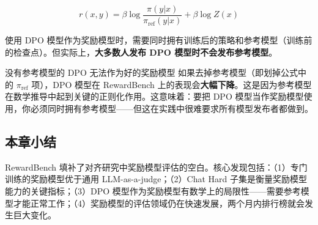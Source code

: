 $$r(x, y) = \beta \log \frac{\pi(y|x)}{\pi_{\mathrm{ref}}(y|x)} + \beta \log Z(x)$$

使用 DPO 模型作为奖励模型时，需要同时拥有训练后的策略和参考模型（训练前的检查点）。但实际上，\textbf{大多数人发布 DPO 模型时不会发布参考模型}。

\begin{warningbox}{没有参考模型的 DPO 无法作为好的奖励模型}
如果去掉参考模型（即划掉公式中的 $\pi_{\mathrm{ref}}$ 项），DPO 模型在 RewardBench 上的表现会\textbf{大幅下降}。这是因为参考模型在数学推导中起到关键的正则化作用。这意味着：要把 DPO 模型当作奖励模型使用，你必须同时拥有参考模型——但这在实践中很难要求所有模型发布者都做到。
\end{warningbox}

\subsection{本章小结}

RewardBench 填补了对齐研究中奖励模型评估的空白。核心发现包括：（1）专门训练的奖励模型优于通用 LLM-as-a-judge；（2）Chat Hard 子集是衡量奖励模型能力的关键指标；（3）DPO 模型作为奖励模型有数学上的局限性——需要参考模型才能正常工作；（4）奖励模型的评估领域仍在快速发展，两个月内排行榜就会发生巨大变化。


